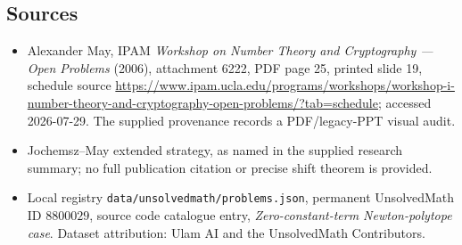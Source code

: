 \documentclass[11pt]{article}
\begin{document}
\subsection{Sources}
\begin{itemize}
\item Alexander May, IPAM \emph{Workshop on Number Theory and Cryptography --- Open Problems} (2006), attachment 6222, PDF page 25, printed slide 19, schedule source \url{https://www.ipam.ucla.edu/programs/workshops/workshop-i-number-theory-and-cryptography-open-problems/?tab=schedule}; accessed 2026-07-29. The supplied provenance records a PDF/legacy-PPT visual audit.
\item Jochemsz--May extended strategy, as named in the supplied research summary; no full publication citation or precise shift theorem is provided.
\item Local registry \texttt{data/unsolvedmath/problems.json}, permanent UnsolvedMath ID $8800029$, source code catalogue entry, \emph{Zero-constant-term Newton-polytope case}. Dataset attribution: Ulam AI and the UnsolvedMath Contributors.
\end{itemize}
\end{document}
